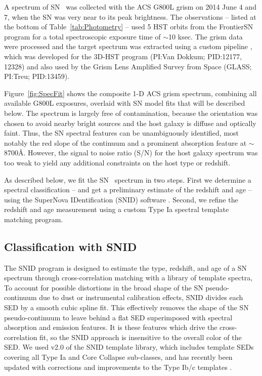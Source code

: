 A spectrum of SN \tomas\ was collected with the ACS G800L grism on
2014 June 4 and 7, when the SN was very near to its peak brightness.
The observations -- listed at the bottom of Table~\ref{tab:Photometry}
-- used 5 HST orbits from the FrontierSN program for a total
spectroscopic exposure time of $\sim$10 ksec.  The grism data were
processed and the target spectrum was extracted using a custom
pipeline \citep{Brammer:2012}, which was developed for the 3D-HST
program (PI:Van Dokkum; PID:12177, 12328) and also used by the Grism
Lens Amplified Survey from Space (GLASS; PI:Treu; PID:13459).

Figure~\ref{fig:SpecFit} shows the composite 1-D ACS grism spectrum,
combining all available G800L exposures, overlaid with SN model fits
that will be described below.  The spectrum is largely free of
contamination, because the orientation was chosen to avoid nearby
bright sources and the host galaxy is diffuse and optically faint.
Thus, the SN spectral features can be unambiguously identified, most
notably the red slope of the continuum and a prominent absorption
feature at $\sim$8700\AA.  However, the signal to noise ratio (S/N)
for the host galaxy spectrum was too weak to yield any additional
constraints on the host type or redshift.

As described below, we fit the SN \tomas\ spectrum in two steps.
First we determine a spectral classification -- and get a preliminary
estimate of the redshift and age -- using the SuperNova IDentification
(SNID) software \citep{Blondin:2007}.  Second, we refine the redshift
and age measurement using a custom Type Ia spectral template matching
program.

\subsection{Classification with SNID}
\label{sec:SNID}

The SNID program is designed to estimate the type, redshift, and age
of a SN spectrum through cross-correlation matching with a library of
template spectra, 
To account for possible distortions in the broad shape of the SN
pseudo-continuum due to dust or instrumental calibration effects, SNID
divides each SED by a smooth cubic spline fit. This effectively
removes the shape of the SN pseudo-continuum to leave behind a flat
SED superimposed with spectral absorption and emission features.  It
is these features which drive the cross-correlation fit, so the SNID
approach is insensitive to the overall color of the SED.  We used v2.0
of the SNID template library, which includes template SEDs covering
all Type Ia and Core Collapse sub-classes, and has recently been
updated with corrections and improvements to the Type Ib/c
templates \citep{Liu:2014}.

